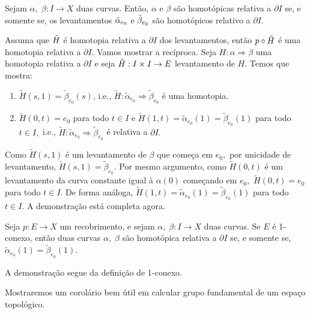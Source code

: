 \begin{corol}
    Sejam $\alpha,\;\beta:I\rightarrow X$ duas curvas. Então, $\alpha$ e $\beta$ são homotópicas relativa a $\partial I$ se, e somente se, os levantamentos $\Tilde{\alpha}_{e_0}$ e $\Tilde{\beta}_{e_0}$ são homotópicos relativo a $\partial I.$ 
\end{corol}

\begin{dem}
    Assuma que $\Tilde{H}$ é homotopia relativa a $\partial I$ dos levantamentos, então $p\circ\Tilde{H}$ é uma homotopia relativa a $\partial I.$ Vamos mostrar a recíproca. Seja $H:\alpha\Rightarrow \beta$ uma homotopia relativa a $\partial I$ e seja $\Tilde{H}:I\times I\rightarrow E$ levantamento de $H$. Temos que mostra:
    \begin{enumerate}
        \item $\tilde{H}(s,1)=\tilde{\beta}_{e_0}(s)$, i.e., $\tilde{H}:\tilde{\alpha}_{e_0}\Rightarrow\tilde{\beta}_{e_0}$ é uma homotopia.
        \item $\tilde{H}(0,t)=e_0$ para todo $t\in I$ e $\tilde{H}(1,t)=\tilde{\alpha}_{e_0}(1)=\tilde{\beta}_{e_0}(1)$ para todo $t\in I,$ i.e., $\tilde{H}:\tilde{\alpha}_{e_0}\Rightarrow\tilde{\beta}_{e_0}$ é relativa a $\partial I.$
    \end{enumerate}
    Como $\tilde{H}(s,1)$ é um levantamento de $\beta$ que começa em $e_0,$ por unicidade de levantamento, $\tilde{H}(s,1)=\tilde{\beta}_{e_0}.$ Por mesmo argumento, como $\tilde{H}(0,t)$ é um levantamento da curva constante igual à $\alpha(0)$ começando em $e_0,$ $\tilde{H}(0,t)=e_0$ para todo $t\in I.$ De forma análoga, $\tilde{H}(1,t)=\tilde{\alpha}_{e_0}(1)=\tilde{\beta}_{e_0}(1)$ para todo $t\in I.$ A demonstração está completa agora. 
\end{dem}

\begin{corol}
    Seja $p:E\rightarrow X$ um recobrimento, e sejam $\alpha,\;\beta:I\rightarrow X$ duas curvas. Se $E$ é 1-conexo, então duas curvas $\alpha,\;\beta$ são homotópica relativa a $\partial I$ se, e somente se, $\tilde{\alpha}_{e_0}(1)=\tilde{\beta}_{e_0}(1).$
\end{corol}

\begin{dem}
    A demonstração segue da definição de 1-conexo.
\end{dem}

Mostraremos um corolário bem útil em calcular grupo fundamental de um espaço topológico.

